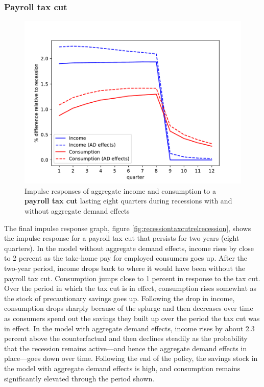 \documentclass[\econtexRoot/HAFiscal]{subfiles}
\begin{document}
\subsubsection{Payroll tax cut}

\begin{figure}[t]
  \centering
  \includegraphics[width=0.8\linewidth]{Code/HA-Models/FromPandemicCode/Figures/recession_taxcut_relrecession}
  \caption{Impulse responses of aggregate income and consumption to a \textbf{payroll tax cut} lasting eight quarters during recessions with and without aggregate demand effects}
  \notinsubfile{\label{fig:recessiontaxcutrelrecession}}
\end{figure}

The final impulse response graph, figure \ref{fig:recessiontaxcutrelrecession}, shows the impulse response for a payroll tax cut that persists for two years (eight quarters). In the model without aggregate demand effects, income rises by close to 2 percent as the take-home pay for employed consumers goes up. After the two-year period, income drops back to where it would have been without the payroll tax cut. Consumption jumps close to 1 percent in response to the tax cut. Over the period in which the tax cut is in effect, consumption rises somewhat as the stock of precautionary savings goes up. Following the drop in income, consumption drops sharply because of the splurge and then decreases over time as consumers spend out the savings they built up over the period the tax cut was in effect. In the model with aggregate demand effects, income rises by about 2.3 percent above the counterfactual and then declines steadily as the probability that the recession remains active---and hence the aggregate demand effects in place---goes down over time. Following the end of the policy, the savings stock in the model with aggregate demand effects is high, and consumption remains significantly elevated through the period shown.
\end{document}
